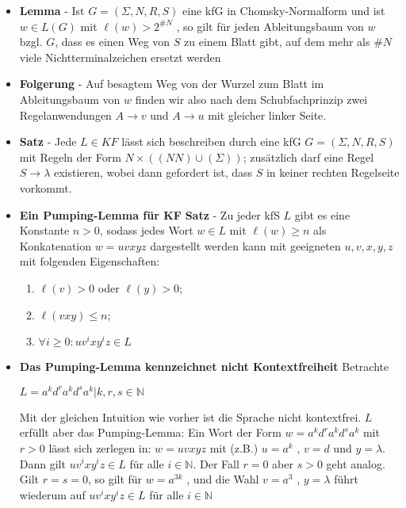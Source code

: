 \documentclass[12pt, a4paper]{article}
\begin{document}
\begin{itemize}
		\item \textbf{Lemma} - Ist $G = (\Sigma, N, R, S)$ eine kfG in Chomsky-Normalform und ist $w\in L(G)$ mit $\ell(w)>2^{\#N}$ , so gilt für jeden Ableitungsbaum von $w$ bzgl. $G$, dass es einen Weg von $S$ zu einem Blatt gibt, auf dem mehr als $\#N$ viele Nichtterminalzeichen ersetzt werden
		
		\item \textbf{Folgerung} - Auf besagtem Weg von der Wurzel zum Blatt im Ableitungsbaum von $w$ finden wir also nach dem Schubfachprinzip zwei Regelanwendungen $A\rightarrow v$ und $A\rightarrow u$ mit gleicher linker Seite.
		
		\item \textbf{Satz} - Jede $L \in KF$ lässt sich beschreiben durch eine kfG $G=(\Sigma,N,R,S)$ mit Regeln der Form $N\times((NN)\cup(\Sigma))$; zusätzlich darf eine Regel $S\rightarrow\lambda$ existieren, wobei dann gefordert ist, dass $S$ in keiner rechten Regelseite vorkommt.
		
		\item \textbf{Ein Pumping-Lemma für KF}
			\subitem \textbf{Satz} - Zu jeder kfS $L$ gibt es eine Konstante $n>0$, sodass jedes Wort $w\in L$ mit $\ell(w)\geq n$ als Konkatenation $w = uvxyz$ dargestellt werden kann mit geeigneten $u, v, x, y, z$ mit folgenden Eigenschaften:
			\begin{enumerate}
				\item $\ell(v)>0$ oder $\ell(y)>0$;
				\item $\ell(vxy)\leq n$;
				\item $\forall i\geq0:uv^{i}xy^{i}z\in L$
			\end{enumerate}
		
		\item \textbf{Das Pumping-Lemma kennzeichnet nicht Kontextfreiheit}
			\subitem Betrachte
			\begin{center}
				$L = {a^{k}d^{r}a^{k}d^{s}a^{k}|k,r,s\in\mathbb{N}}$
			\end{center}
			\subitem Mit der gleichen Intuition wie vorher ist die Sprache nicht kontextfrei.
			\subitem $L$ erfüllt aber das Pumping-Lemma:
			\subitem Ein Wort der Form $w=a^{k}d^{r}a^{k}d^{s}a^{k}$ mit $r>0$ lässt sich zerlegen in: $w=uvxyz$
			mit (z.B.) $u=a^{k}$ , $v=d$ und $y=\lambda$.
			\subitem Dann gilt $uv^{i}xy^{i}z\in L$ für alle $i\in\mathbb{N}$.
			\subitem Der Fall $r = 0$ aber $s>0$ geht analog.
			\subitem Gilt $r = s = 0$, so gilt für $w = a^{3k}$ , und die Wahl $v = a^{3}$ , $y = \lambda$ führt wiederum auf $uv^{i}xy^{i}z\in L$ für alle $i\in\mathbb{N}$
			

\end{itemize}
\end{document}

